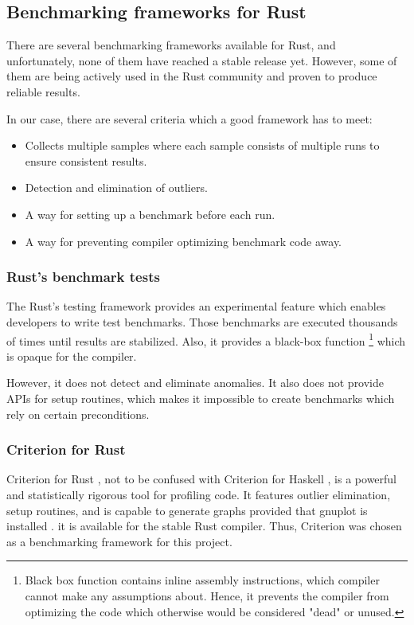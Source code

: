 \subsection{Benchmarking frameworks for Rust}

There are several benchmarking frameworks available for Rust, and unfortunately, none of them have reached a stable release yet. However, some of them are being actively used in the Rust community and proven to produce reliable results.  

In our case, there are several criteria which a good framework has to meet:

\begin{itemize}
    \item Collects multiple samples where each sample consists of multiple runs to ensure consistent results. 
    \item Detection and elimination of outliers.     
    \item A way for setting up a benchmark before each run. 
    \item A way for preventing compiler optimizing benchmark code away.     
\end{itemize}

\subsubsection*{Rust's benchmark tests}
The Rust's testing framework provides an experimental feature which enables developers to write test benchmarks. Those benchmarks are executed thousands of times until results are stabilized. Also, it provides a black-box function \footnote{Black box function contains inline assembly instructions, which compiler cannot make any assumptions about. Hence, it prevents the compiler from optimizing the code which otherwise would be considered "dead" or unused.} which is opaque for the compiler. 

However, it does not detect and eliminate anomalies. It also does not provide APIs for setup routines, which makes it impossible to create benchmarks which rely on certain preconditions.

\subsubsection*{Criterion for Rust}
Criterion for Rust , not to be confused with Criterion for Haskell , is a powerful and statistically rigorous tool for profiling code. It features outlier elimination, setup routines, and is capable to generate graphs provided that gnuplot is installed . it is available for the stable Rust compiler. Thus, Criterion was chosen as a benchmarking framework for this project. 

